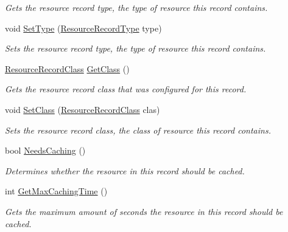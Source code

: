 \begin{DoxyCompactItemize}
\begin{DoxyCompactList}\small\item\em Gets the resource record type, the type of resource this record contains. \end{DoxyCompactList}\item 
void \hyperlink{class_senergy_1_1_dns_1_1_resource_record_base_affcaab56c3632a361a654ed5bc79b3c4}{Set\-Type} (\hyperlink{namespace_senergy_1_1_dns_a590bfd748c955364770f5ce358d9dfe0}{Resource\-Record\-Type} type)
\begin{DoxyCompactList}\small\item\em Sets the resource record type, the type of resource this record contains. \end{DoxyCompactList}\item 
\hyperlink{namespace_senergy_1_1_dns_a953f153bc411213d621d00c1e1b3eb9d}{Resource\-Record\-Class} \hyperlink{class_senergy_1_1_dns_1_1_resource_record_base_a4abfe4f1eeb552494be535c271abe18f}{Get\-Class} ()
\begin{DoxyCompactList}\small\item\em Gets the resource record class that was configured for this record. \end{DoxyCompactList}\item 
void \hyperlink{class_senergy_1_1_dns_1_1_resource_record_base_a87d4a0202837700dbc6662d9aff8f385}{Set\-Class} (\hyperlink{namespace_senergy_1_1_dns_a953f153bc411213d621d00c1e1b3eb9d}{Resource\-Record\-Class} clas)
\begin{DoxyCompactList}\small\item\em Sets the resource record class, the class of resource this record contains. \end{DoxyCompactList}\item 
bool \hyperlink{class_senergy_1_1_dns_1_1_resource_record_base_a7b6733ccb332b22335e33e09ad7bddd0}{Needs\-Caching} ()
\begin{DoxyCompactList}\small\item\em Determines whether the resource in this record should be cached. \end{DoxyCompactList}\item 
int \hyperlink{class_senergy_1_1_dns_1_1_resource_record_base_a96094f0e13f517b6462cd193f9b82f80}{Get\-Max\-Caching\-Time} ()
\begin{DoxyCompactList}\small\item\em Gets the maximum amount of seconds the resource in this record should be cached. \end{DoxyCompactList}\item 

\end{DoxyCompactItemize}
